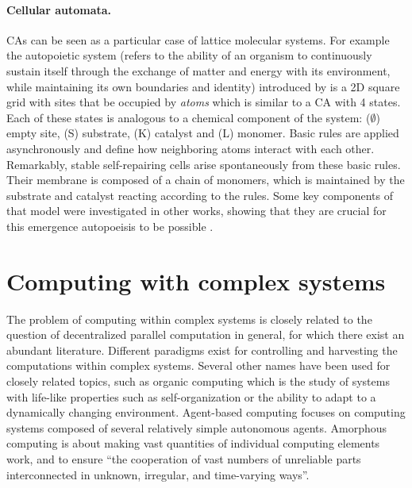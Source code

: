 \paragraph{Cellular automata.}
\Acfp{CA} can be seen as a particular case of lattice molecular systems. For
example the autopoietic system (refers to the ability of an organism to continuously 
sustain itself through the exchange of matter and energy with its environment, 
while maintaining its own boundaries and identity) introduced by
\textcite{varelaAutopoiesisOrganizationLiving1991} is a 2D square grid with
sites that be occupied by \emph{atoms} which is similar to a \ac{CA} with 4
states. Each of these states is analogous to a chemical component of the system:
($\emptyset$) empty site, (S) substrate, (K) catalyst and (L) monomer. Basic rules are
applied asynchronously and define how neighboring atoms interact with each
other. Remarkably, stable self-repairing cells arise spontaneously from these
basic rules. Their membrane is composed of a chain of monomers, which is
maintained by the substrate and catalyst reacting according to the rules. Some
key components of that model were investigated in other works, showing that they
are crucial for this emergence autopoeisis to be possible
\parencite{zelenySelforganizationLivingSystems1977,
  mcmullinRediscoveringComputationalAutopoiesis1997}.

\section{Computing with complex systems}\label{sec:comp-with-compl}

The problem of computing within complex systems is closely related to the
question of decentralized parallel computation in general, for which there exist
an abundant literature. Different paradigms exist for controlling and harvesting
the computations within complex systems. Several other names have been used for
closely related topics, such as organic computing
\parencite{muller-schloerOrganicComputingParadigm2011} which is the study of
systems with life-like properties such as self-organization or the ability to
adapt to a dynamically changing environment. Agent-based computing
\parencite{jenningsAgentBasedComputingPromise1999} focuses on computing systems
composed of several relatively simple autonomous agents. Amorphous computing
\parencite{abelsonAmorphousComputing2000,
  nagpalProgrammablePatternFormationScaleIndependence2008,
  nagpalProgrammableSelfassemblyUsing2002} is about making vast quantities of
individual computing elements work, and to ensure ``the cooperation of vast
numbers of unreliable parts interconnected in unknown, irregular, and
time-varying ways''.

